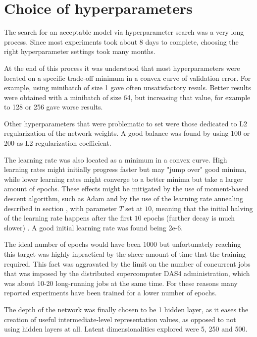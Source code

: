 \section{Choice of hyperparameters}

The search for an acceptable model via hyperparameter search was a very long process.
Since most experiments took about 8 days to complete, choosing the right hyperparameter
settings took many months.

At the end of this process it was understood that most hyperparameters were located
on a specific trade-off minimum in a convex curve of validation error.
For example, using minibatch of size 1 gave
often unsatisfactory resuls. Better results were obtained with a minibatch of size 64,
but increasing that value, for example to 128 or 256 gave worse results.

Other hyperparameters that were problematic to set were those dedicated to 
L2 regularization of the network weights. A good balance was found by using 100 or 200 
as L2 regularization coefficient.

The learning rate was also located as a minimum in a convex curve.
High learning rates might initially progress faster but may "jump over" good minima,
while lower learning rates might converge to a better minima but take a larger amount of
epochs. These effects might be mitigated by the use of moment-based descent algorithm,
such as
Adam \cite{KingmaB14} and by the use of 
the learning rate annealing described in section \cite{annealing}, with
parameter $T$ set at $10$, meaning that the initial halving of the learning rate
happens after the first $10$ epochs (further decay is much slower)
. A good initial learning rate was found being 2e-6.

The ideal number of epochs would have been $1000$ but unfortunately reaching
this target was highly inpractical by the sheer amount of time that the training
required. This fact was aggravated by the limit on the number of concurrent
jobs that was imposed by the distributed supercomputer DAS4 administration,
which was about 10-20 long-running jobs at the same time.
For these reasons many reported experiments have been trained for a lower number of
epochs.

The depth of the network was finally chosen to be 1 hidden layer,
as it eases the creation of useful intermediate-level
representation values, as opposed to not using hidden layers at all. Latent dimensionalities explored were 5, 250 and 500. 



